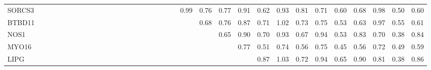 \begin{longtable}{lrrrrrrrrrrrrrrrrrrrrrrrrrrrrrrrrr}
SORCS3  &             &              &              &              &               &           &            &             &              &             &           &             &              &            &              &              &              &             &               &              &         0.99 &       0.76 &        0.77 &       0.91 &          0.62 &          0.93 &        0.81 &        0.71 &          0.60 &          0.68 &       0.98 &          0.50 &       0.60 \\
BTBD11  &             &              &              &              &               &           &            &             &              &             &           &             &              &            &              &              &              &             &               &              &              &       0.68 &        0.76 &       0.87 &          0.71 &          1.02 &        0.73 &        0.75 &          0.53 &          0.63 &       0.97 &          0.55 &       0.61 \\
NOS1    &             &              &              &              &               &           &            &             &              &             &           &             &              &            &              &              &              &             &               &              &              &            &        0.65 &       0.90 &          0.70 &          0.93 &        0.67 &        0.94 &          0.53 &          0.83 &       0.70 &          0.38 &       0.84 \\
MYO16   &             &              &              &              &               &           &            &             &              &             &           &             &              &            &              &              &              &             &               &              &              &            &             &       0.77 &          0.51 &          0.74 &        0.56 &        0.75 &          0.45 &          0.56 &       0.72 &          0.49 &       0.59 \\
LIPG    &             &              &              &              &               &           &            &             &              &             &           &             &              &            &              &              &              &             &               &              &              &            &             &            &          0.87 &          1.03 &        0.72 &        0.94 &          0.65 &          0.90 &       0.81 &          0.38 &       0.86 \\

\end{longtable}
